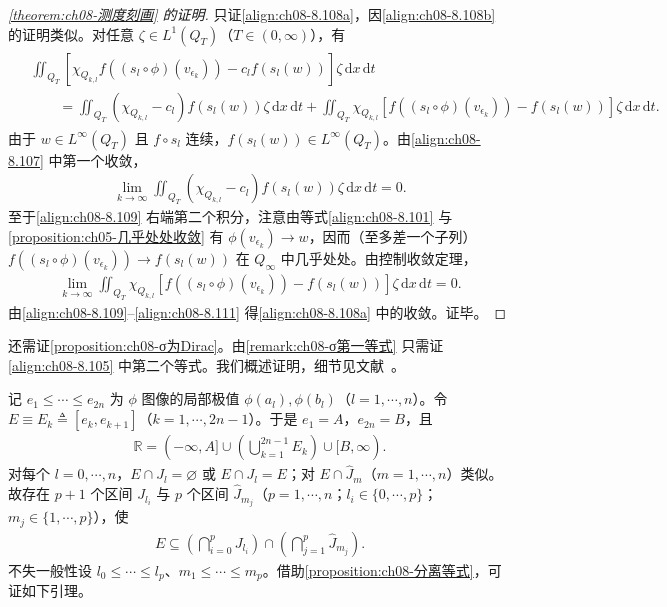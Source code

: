 \documentclass[../../main.tex]{subfiles}%
\begin{document}
\begin{proof}[\cref{theorem:ch08-测度刻画} 的证明]
只证\eqref{align:ch08-8.108a}，因\eqref{align:ch08-8.108b} 的证明类似。对任意 $\zeta\in L^1(Q_T)$（$T\in(0,\infty)$），有
\begin{align}
\begin{aligned}
&\iint_{Q_T}[\chi_{Q_{k,l}}f((s_l\circ\phi)(v_{\epsilon_k}))-c_l f(s_l(w))]\zeta\,\mathrm{d}x\,\mathrm{d}t\\
&\qquad=\iint_{Q_T}(\chi_{Q_{k,l}}-c_l)f(s_l(w))\zeta\,\mathrm{d}x\,\mathrm{d}t
+\iint_{Q_T}\chi_{Q_{k,l}}[f((s_l\circ\phi)(v_{\epsilon_k}))-f(s_l(w))]\zeta\,\mathrm{d}x\,\mathrm{d}t.
\end{aligned} \label{align:ch08-8.109}
\end{align}
由于 $w\in L^\infty(Q_T)$ 且 $f\circ s_l$ 连续，$f(s_l(w))\in L^\infty(Q_T)$。由\eqref{align:ch08-8.107} 中第一个收敛，
\begin{align}
\lim_{k\to\infty}\iint_{Q_T}(\chi_{Q_{k,l}}-c_l)f(s_l(w))\zeta\,\mathrm{d}x\,\mathrm{d}t=0. \label{align:ch08-8.110}
\end{align}
至于\eqref{align:ch08-8.109} 右端第二个积分，注意由等式\eqref{align:ch08-8.101} 与\cref{proposition:ch05-几乎处处收敛} 有 $\phi(v_{\epsilon_k})\to w$，因而（至多差一个子列）$f((s_l\circ\phi)(v_{\epsilon_k}))\to f(s_l(w))$ 在 $Q_\infty$ 中几乎处处。由控制收敛定理，
\begin{align}
\lim_{k\to\infty}\iint_{Q_T}\chi_{Q_{k,l}}[f((s_l\circ\phi)(v_{\epsilon_k}))-f(s_l(w))]\zeta\,\mathrm{d}x\,\mathrm{d}t=0. \label{align:ch08-8.111}
\end{align}
由\eqref{align:ch08-8.109}--\eqref{align:ch08-8.111} 得\eqref{align:ch08-8.108a} 中的收敛。证毕。
\end{proof}

还需证\cref{proposition:ch08-σ为Dirac}。由\cref{remark:ch08-σ第一等式} 只需证\eqref{align:ch08-8.105} 中第二个等式。我们概述证明，细节见文献~\cite{ref30}。

记 $e_1\leqslant\cdots\leqslant e_{2n}$ 为 $\phi$ 图像的局部极值 $\phi(a_l),\phi(b_l)$（$l=1,\cdots ,n$）。令 $E\equiv E_k\triangleq [e_k,e_{k+1}]$（$k=1,\cdots ,2n-1$）。于是 $e_1=A$，$e_{2n}=B$，且
\begin{align*}
\mathbb{R}=(-\infty,A]\cup\left(\bigcup_{k=1}^{2n-1}E_k\right)\cup[B,\infty).
\end{align*}
对每个 $l=0,\cdots ,n$，$E\cap J_l=\varnothing $ 或 $E\cap J_l=E$；对 $E\cap\widehat J_m$（$m=1,\cdots ,n$）类似。故存在 $p+1$ 个区间 $J_{l_i}$ 与 $p$ 个区间 $\widehat J_{m_j}$（$p=1,\cdots ,n$；$l_i\in\{0,\cdots ,p\}$；$m_j\in\{1,\cdots ,p\}$），使
\begin{align}
E\subseteq\left(\bigcap_{i=0}^p J_{l_i}\right)\cap\left(\bigcap_{j=1}^p\widehat J_{m_j}\right). \label{align:ch08-8.112}
\end{align}
不失一般性设 $l_0\leqslant\cdots\leqslant l_p$、$m_1\leqslant\cdots\leqslant m_p$。借助\cref{proposition:ch08-分离等式}，可证如下引理。
\end{document}
